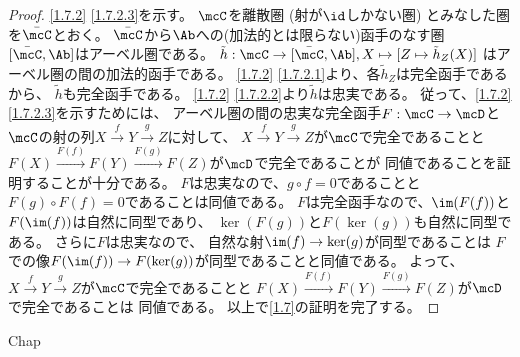 \documentclass[uplatex,dvipdfmx]{jsarticle}
\begin{document}
\begin{proof}
  \ref{1.7.2} \ref{1.7.2.3}を示す。
  \(\mcC\)を離散圏 (射が\(\id\)しかない圏) とみなした圏を\(\bar{\mcC}\)とおく。
  \(\bar{\mcC}\)から\(\Ab\)への(加法的とは限らない)函手のなす圏
  \([\bar{\mcC},\Ab]\)はアーベル圏である。
  \(\tilde{h}:\mcC\to [\bar{\mcC},\Ab], X\mapsto [Z\mapsto \tilde{h}_Z(X)]\)
  はアーベル圏の間の加法的函手である。
  \ref{1.7.2} \ref{1.7.2.1}より、各\(\tilde{h}_Z\)は完全函手であるから、
  \(\tilde{h}\)も完全函手である。
  \ref{1.7.2} \ref{1.7.2.2}より\(\tilde{h}\)は忠実である。
  従って、\ref{1.7.2} \ref{1.7.2.3}を示すためには、
  アーベル圏の間の忠実な完全函手\(F:\mcC\to \mcD\)と
  \(\mcC\)の射の列\(X\xrightarrow{f} Y \xrightarrow{g} Z\)に対して、
  \(X\xrightarrow{f} Y \xrightarrow{g} Z\)が\(\mcC\)で完全であることと
  \(F(X)\xrightarrow{F(f)}F(Y)\xrightarrow{F(g)}F(Z)\)が\(\mcD\)で完全であることが
  同値であることを証明することが十分である。
  \(F\)は忠実なので、\(g\circ f = 0\)であることと\(F(g)\circ F(f) = 0\)であることは同値である。
  \(F\)は完全函手なので、\(\im(F(f))\)と\(F(\im(f))\)は自然に同型であり、
  \(\ker(F(g))\)と\(F(\ker(g))\)も自然に同型である。
  さらに\(F\)は忠実なので、
  自然な射\(\im(f)\to \ker(g)\)が同型であることは
  \(F\)での像\(F(\im(f))\to F(\ker(g))\)が同型であることと同値である。
  よって、\(X\xrightarrow{f} Y \xrightarrow{g} Z\)が\(\mcC\)で完全であることと
  \(F(X)\xrightarrow{F(f)}F(Y)\xrightarrow{F(g)}F(Z)\)が\(\mcD\)で完全であることは
  同値である。
  以上で\autoref{1.7}の証明を完了する。
\end{proof}





\ifcsname Chap\endcsname\else
\printbibliography
\end{document}
